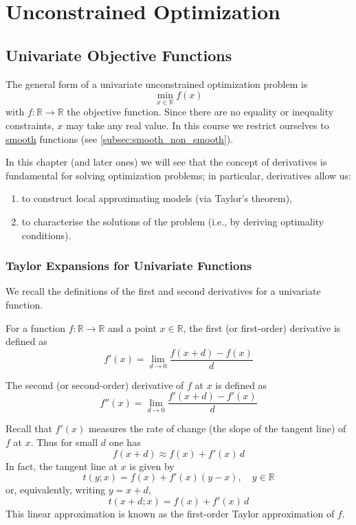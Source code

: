 \documentclass[9pt, headings=standardclasses, parskip=half]{scrartcl}
\renewcommand{\emph}[1]{\textcolor{mypurple}{#1}}
\begin{document}

\clearpage
\section{Unconstrained Optimization}\label{sec:unconstrained_optimization}

\subsection{Univariate Objective Functions}
The general form of a univariate unconstrained optimization problem is
\[
\min_{x\in\mathbb{R}} f(x)
\]
with \(f:\mathbb{R}\to\mathbb{R}\) the objective function. Since there are no equality or inequality constraints, \(x\) may take any real value. 
In this course we restrict ourselves to \hyperref[subsec:smooth_non_smooth]{smooth} functions (see \ref{subsec:smooth_non_smooth}).

In this chapter (and later ones) we will see that the concept of derivatives is fundamental for solving optimization problems; in particular, derivatives allow us:
\begin{enumerate}
  \item to construct local approximating models (via Taylor's theorem),
  \item to characterise the solutions of the problem (i.e., by deriving optimality conditions).
\end{enumerate}

\subsubsection{Taylor Expansions for Univariate Functions}
We recall the definitions of the first and second derivatives for a univariate function.

\begin{definition}
For a function \(f:\mathbb{R}\to\mathbb{R}\) and a point \(x\in\mathbb{R}\), the first (or first-order) derivative is defined as
\[
f'(x)=\lim_{d\to 0}\frac{f(x+d)-f(x)}{d}
\]
\end{definition}

\begin{definition}
The second (or second-order) derivative of \(f\) at \(x\) is defined as
\[
f''(x)=\lim_{d\to 0}\frac{f'(x+d)-f'(x)}{d}
\]
\end{definition}

Recall that \(f'(x)\) measures the rate of change (the slope of the tangent line) of \(f\) at \(x\). Thus for small \(d\) one has
\[
f(x+d)\approx f(x)+f'(x)\,d
\]
In fact, the tangent line at \(x\) is given by
\[
t(y;x)=f(x)+f'(x)(y-x),\quad y\in\mathbb{R}
\]
or, equivalently, writing \(y=x+d\),
\[
t(x+d;x)=f(x)+f'(x)\,d
\]
This linear approximation is known as the \emph{first-order Taylor approximation} of \(f\).
\end{document}
